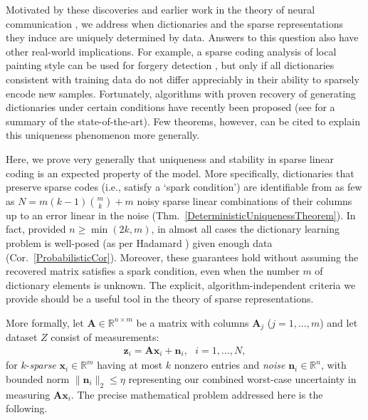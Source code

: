 \documentclass[9pt,twocolumn]{pnas-new}
\begin{document}
Motivated by these discoveries and earlier work in the theory of neural communication \cite{Coulter10, Isely10}, we address when dictionaries and the sparse representations they induce are uniquely determined by data.  Answers to this question also have other real-world implications.  For example, a sparse coding analysis of local painting style can be used for forgery detection \cite{hughes2010, Olshausen10}, but only if all dictionaries consistent with training data do not differ appreciably in their ability to sparsely encode new samples. %
Fortunately, algorithms with proven recovery of generating dictionaries under certain 
conditions have recently been proposed (see \cite[Sec.~I-E]{Sun16} for a summary of the state-of-the-art). Few theorems, however, can be cited to explain this uniqueness phenomenon more generally.

Here, we prove very generally that uniqueness and stability in sparse linear coding is an expected property of the model. %
More specifically, dictionaries that preserve sparse codes (i.e., satisfy a `spark condition') are identifiable from as few as \mbox{$N = m(k-1){m \choose k} + m$} noisy sparse linear combinations of their columns up to an error linear in the noise (Thm.~\ref{DeterministicUniquenessTheorem}). In fact, provided $n \geq \min(2k,m)$, in almost all cases the dictionary learning problem is well-posed (as per Hadamard \cite{Hadamard1902}) given enough data (Cor.~\ref{ProbabilisticCor}). Moreover, these guarantees hold without assuming the recovered matrix satisfies a spark condition, even when the number $m$ of dictionary elements is unknown. The explicit, algorithm-independent criteria we provide should be a useful tool in the theory of sparse representations.


More formally, let $\mathbf{A} \in \mathbb R^{n \times m}$ be a matrix with columns $\mathbf{A}_j$ ($j = 1,\ldots,m$) and let dataset $Z$ consist of measurements:
\begin{align}\label{LinearModel}
\mathbf{z}_i = \mathbf{A}\mathbf{x}_i + \mathbf{n}_i,\ \ \  \text{$i=1,\ldots,N$},
\end{align}
for $k$-\emph{sparse} $\mathbf{x}_i \in \mathbb{R}^m$ having at most $k$ nonzero entries and \emph{noise} $\mathbf{n}_i \in \mathbb{R}^n$, with bounded norm $\| \mathbf{n}_i \|_2 \leq  \eta$ representing our combined worst-case uncertainty in  measuring $\mathbf{A}\mathbf{x}_i$.
The precise mathematical problem addressed here is the following.
\end{document}
